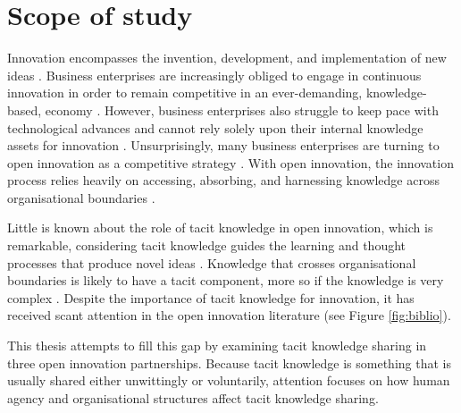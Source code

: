  \section{Scope of study}

Innovation encompasses the invention, development, and implementation of new ideas \citep{garud2013perspectives}. Business enterprises are increasingly obliged to engage in continuous innovation in order to remain competitive in an ever-demanding, knowledge-based, economy \citep{lubit2001keys,urbancova2013competitive}. However, business enterprises also struggle to keep pace with technological advances and cannot rely solely upon their internal knowledge assets for innovation \citep{chesbrough2009open,enkel2009open}. Unsurprisingly, many business enterprises are turning to open innovation as a competitive strategy \citep{chesbrough2003open,enkel2009open,stanko2017under}. With open innovation, the innovation process relies heavily on accessing, absorbing, and harnessing knowledge across organisational boundaries \citep{chesbrough2017future}. \medskip

Little is known about the role of tacit knowledge in open innovation, which is remarkable, considering tacit knowledge guides the learning and thought processes that produce novel ideas \citep{leonard1998role}.  Knowledge that crosses organisational boundaries is likely to have a tacit component, more so if the knowledge is very complex \citep{seidler2008use}. Despite the importance of tacit knowledge for innovation, it has received scant attention in the open innovation literature (see Figure \ref{fig:biblio}). \medskip

This thesis attempts to fill this gap by examining tacit knowledge sharing in three open innovation partnerships. Because tacit knowledge is something that is usually shared either unwittingly or voluntarily, attention focuses on how human agency and organisational structures affect tacit knowledge sharing. \medskip

